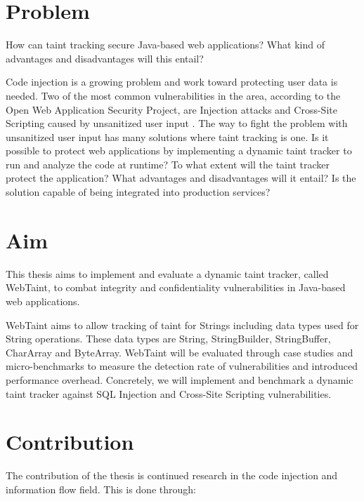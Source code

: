 \section{Problem}
\label{Problem}
\begin{chapquote}{}
    How can taint tracking secure Java-based web applications? What kind of advantages and disadvantages will this entail?
\end{chapquote}

\noindent
Code injection is a growing problem and work toward protecting user data is needed. Two of the most common vulnerabilities in the area, according to the Open Web Application Security Project, are Injection attacks and Cross-Site Scripting caused by unsanitized user input \parencite{OWASP2017}. The way to fight the problem with unsanitized user input has many solutions where taint tracking is one. Is it possible to protect web applications by implementing a dynamic taint tracker to run and analyze the code at runtime? To what extent will the taint tracker protect the application? What advantages and disadvantages will it entail? Is the solution capable of being integrated into production services?



\section{Aim}
\label{Aim}
This thesis aims to implement and evaluate a dynamic taint tracker, called WebTaint, to combat integrity and confidentiality vulnerabilities in Java-based web applications. 

WebTaint aims to allow tracking of taint for Strings including data types used for String operations. These data types are String, StringBuilder, StringBuffer, CharArray and ByteArray. WebTaint will be evaluated through case studies and micro-benchmarks to measure the detection rate of vulnerabilities and introduced performance overhead. Concretely, we will implement and benchmark a dynamic taint tracker against SQL Injection and Cross-Site Scripting vulnerabilities. 



\section{Contribution}
\label{Contribution}
The contribution of the thesis is continued research in the code injection and information flow field. This is done through:

